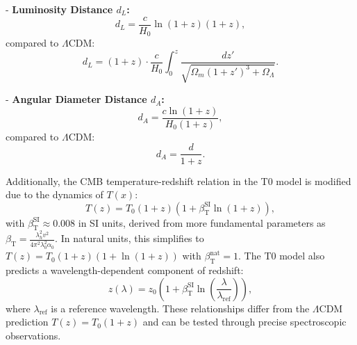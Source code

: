 \documentclass[12pt,a4paper]{article}
\newcommand{\Tfield}{T(x)}
\newcommand{\betaT}{\beta_{\text{T}}}
\begin{document}
	- \textbf{Luminosity Distance \( d_L \):}
	\[
	d_L = \frac{c}{H_0} \ln(1 + z) (1 + z),
	\]
	compared to \(\Lambda\)CDM:
	\[
	d_L = (1 + z) \cdot \frac{c}{H_0} \int_0^z \frac{dz'}{\sqrt{\Omega_m (1 + z')^3 + \Omega_\Lambda}}.
	\]
	
	- \textbf{Angular Diameter Distance \( d_A \):}
	\[
	d_A = \frac{c \ln(1 + z)}{H_0 (1 + z)},
	\]
	compared to \(\Lambda\)CDM:
	\[
	d_A = \frac{d}{1 + z}.
	\]
	
Additionally, the CMB temperature-redshift relation in the T0 model is modified due to the dynamics of \( \Tfield \):
\begin{equation}
	T(z) = T_0 (1 + z) (1 + \betaT^{\text{SI}} \ln(1 + z)),
\end{equation}
with \(\betaT^{\text{SI}} \approx 0.008\) in SI units, derived from more fundamental parameters as \(\betaT = \frac{\lambda_h^2 v^2}{4\pi^2 \lambda_0^2 \alpha_0}\). In natural units, this simplifies to \(T(z) = T_0 (1 + z) (1 + \ln(1 + z))\) with \(\betaT^{\text{nat}} = 1\). The T0 model also predicts a wavelength-dependent component of redshift:
\begin{equation}
	z(\lambda) = z_0 \left(1 + \betaT^{\text{SI}} \ln\left(\frac{\lambda}{\lambda_{\text{ref}}}\right)\right),
\end{equation}
where \(\lambda_{\text{ref}}\) is a reference wavelength. These relationships differ from the \(\Lambda\)CDM prediction \( T(z) = T_0 (1 + z) \) and can be tested through precise spectroscopic observations.
\end{document}
